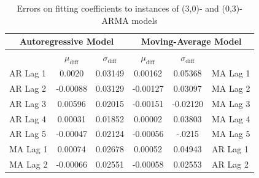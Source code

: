 \documentclass[oneside,12pt,openany]{book}
\begin{document}
    \begin{table}[!ht]
        \centering
        \begin{tabular}{|l|c|c|c|c|l|}
            \hline
            \multicolumn{3}{|c|}{Autoregressive Model} & \multicolumn{3}{c|}{Moving-Average Model} \\ \hline
             \cellcolor{black} & $\mu_{\text{diff}}$ & $\sigma_{\text{diff}}$ & $\mu_{\text{diff}}$ & $\sigma_{\text{diff}}$ &  \cellcolor{black} \\ \hline
            AR Lag 1 & 0.0020 & 0.03149 & 0.00162 & 0.05368 & MA Lag 1 \\ \hline
            AR Lag 2 & -0.00088 & 0.03129 & -0.00127 & 0.03097 & MA Lag 2 \\ \hline
            AR Lag 3 & 0.00596 & 0.02015 & -0.00151 & -0.02120 & MA Lag 3 \\ \hline
            AR Lag 4 & 0.00031 & 0.01852 & 0.00002 & 0.03803 & MA Lag 4 \\ \hline
            AR Lag 5 & -0.00047 & 0.02124 & -0.00056 & -.0215 & MA Lag 5 \\ \hline
            MA Lag 1 & 0.00074 & 0.02678 & 0.00052 & 0.04943 & AR Lag 1 \\ \hline
            MA Lag 2 & -0.00066 & 0.02551 & -0.00058 & 0.02553 & AR Lag 2 \\ \hline
        \end{tabular}
    \caption{Errors on fitting coefficients to instances of (3,0)- and (0,3)-ARMA models}
    \label{tab:errortsfitting3}
    \end{table}
\end{document}
